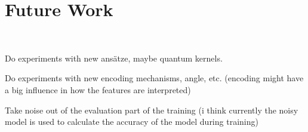 \chapter{Future Work}\label{chapter:future_work} \

Do experiments with new ansätze, maybe quantum kernels.

Do experiments with new encoding mechanisms, angle, etc. (encoding might have a big influence in how the features are interpreted)

Take noise out of the evaluation part of the training (i think currently the noisy model is used to calculate the accuracy of the model during training)